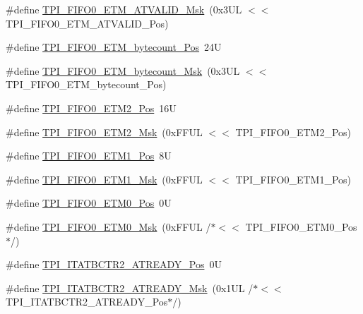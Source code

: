 \begin{DoxyCompactItemize}
\item 
\#define \mbox{\hyperlink{group___c_m_s_i_s___t_p_i_ga4f0005dc420b28f2369179a935b9a9d3}{T\+P\+I\+\_\+\+F\+I\+F\+O0\+\_\+\+E\+T\+M\+\_\+\+A\+T\+V\+A\+L\+I\+D\+\_\+\+Msk}}~(0x3\+U\+L $<$$<$ T\+P\+I\+\_\+\+F\+I\+F\+O0\+\_\+\+E\+T\+M\+\_\+\+A\+T\+V\+A\+L\+I\+D\+\_\+\+Pos)
\item 
\#define \mbox{\hyperlink{group___c_m_s_i_s___t_p_i_ga2f738e45386ebf58c4d406f578e7ddaf}{T\+P\+I\+\_\+\+F\+I\+F\+O0\+\_\+\+E\+T\+M\+\_\+bytecount\+\_\+\+Pos}}~24U
\item 
\#define \mbox{\hyperlink{group___c_m_s_i_s___t_p_i_gad2536b3a935361c68453cd068640af92}{T\+P\+I\+\_\+\+F\+I\+F\+O0\+\_\+\+E\+T\+M\+\_\+bytecount\+\_\+\+Msk}}~(0x3\+U\+L $<$$<$ T\+P\+I\+\_\+\+F\+I\+F\+O0\+\_\+\+E\+T\+M\+\_\+bytecount\+\_\+\+Pos)
\item 
\#define \mbox{\hyperlink{group___c_m_s_i_s___t_p_i_ga5f0037cc80c65e86d9e94e5005077a48}{T\+P\+I\+\_\+\+F\+I\+F\+O0\+\_\+\+E\+T\+M2\+\_\+\+Pos}}~16U
\item 
\#define \mbox{\hyperlink{group___c_m_s_i_s___t_p_i_gaa82a7b9b99c990fb12eafb3c84b68254}{T\+P\+I\+\_\+\+F\+I\+F\+O0\+\_\+\+E\+T\+M2\+\_\+\+Msk}}~(0x\+F\+F\+U\+L $<$$<$ T\+P\+I\+\_\+\+F\+I\+F\+O0\+\_\+\+E\+T\+M2\+\_\+\+Pos)
\item 
\#define \mbox{\hyperlink{group___c_m_s_i_s___t_p_i_gac5a2ef4b7f811d1f3d81ec919d794413}{T\+P\+I\+\_\+\+F\+I\+F\+O0\+\_\+\+E\+T\+M1\+\_\+\+Pos}}~8U
\item 
\#define \mbox{\hyperlink{group___c_m_s_i_s___t_p_i_gaad9c1a6ed34a70905005a0cc14d5f01b}{T\+P\+I\+\_\+\+F\+I\+F\+O0\+\_\+\+E\+T\+M1\+\_\+\+Msk}}~(0x\+F\+F\+U\+L $<$$<$ T\+P\+I\+\_\+\+F\+I\+F\+O0\+\_\+\+E\+T\+M1\+\_\+\+Pos)
\item 
\#define \mbox{\hyperlink{group___c_m_s_i_s___t_p_i_ga48783ce3c695d8c06b1352a526110a87}{T\+P\+I\+\_\+\+F\+I\+F\+O0\+\_\+\+E\+T\+M0\+\_\+\+Pos}}~0U
\item 
\#define \mbox{\hyperlink{group___c_m_s_i_s___t_p_i_gaf924f7d1662f3f6c1da12052390cb118}{T\+P\+I\+\_\+\+F\+I\+F\+O0\+\_\+\+E\+T\+M0\+\_\+\+Msk}}~(0x\+F\+F\+U\+L /$\ast$$<$$<$ T\+P\+I\+\_\+\+F\+I\+F\+O0\+\_\+\+E\+T\+M0\+\_\+\+Pos$\ast$/)
\item 
\#define \mbox{\hyperlink{group___c_m_s_i_s___t_p_i_ga6959f73d7db4a87ae9ad9cfc99844526}{T\+P\+I\+\_\+\+I\+T\+A\+T\+B\+C\+T\+R2\+\_\+\+A\+T\+R\+E\+A\+D\+Y\+\_\+\+Pos}}~0U
\item 
\#define \mbox{\hyperlink{group___c_m_s_i_s___t_p_i_ga1859502749709a2e5ead9a2599d998db}{T\+P\+I\+\_\+\+I\+T\+A\+T\+B\+C\+T\+R2\+\_\+\+A\+T\+R\+E\+A\+D\+Y\+\_\+\+Msk}}~(0x1\+U\+L /$\ast$$<$$<$ T\+P\+I\+\_\+\+I\+T\+A\+T\+B\+C\+T\+R2\+\_\+\+A\+T\+R\+E\+A\+D\+Y\+\_\+\+Pos$\ast$/)

\end{DoxyCompactItemize}
